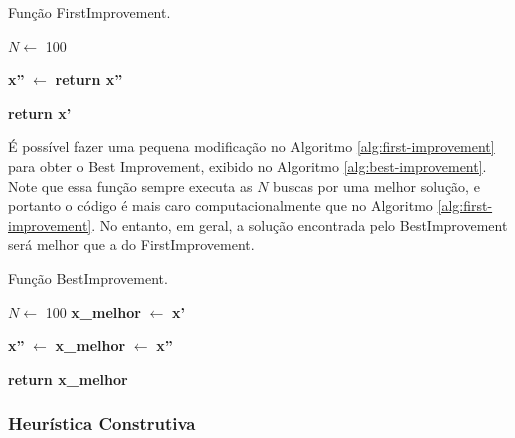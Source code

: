 \documentclass[conference]{IEEEtran}
\begin{document}
\begin{algorithm}[H]
	\caption{Função FirstImprovement.}\label{alg:first-improvement}

	\begin{algorithmic}[1]

	\State $N\gets$ 100 

		\State \textbf{x''} $\gets$  
			\State \textbf{return x''} 
		\EndIf
	\EndFor
		
	\Statex
	\State \textbf{return x'} 
	\EndProcedure 
	\end{algorithmic}
\end{algorithm}

É possível fazer uma pequena modificação no Algoritmo \ref{alg:first-improvement} 
para obter o Best Improvement, exibido no Algoritmo \ref{alg:best-improvement}. 
Note que essa função sempre executa as $N$ buscas por uma melhor solução, e 
portanto o código é mais caro computacionalmente que no Algoritmo \ref{alg:first-improvement}.
No entanto, em geral, a solução encontrada pelo BestImprovement será melhor que a 
do FirstImprovement.

\begin{algorithm}[H]
	\caption{Função BestImprovement.}\label{alg:best-improvement}

	\begin{algorithmic}[1]

	\State $N\gets$ 100 
	\State \textbf{x\_melhor} $\gets$ \textbf{x'}

		\State \textbf{x''} $\gets$  
			\State \textbf{x\_melhor} $\gets$ \textbf{x''}
		\EndIf
	\EndFor
		
	\Statex
	\State \textbf{return x\_melhor} 
	\EndProcedure 
	\end{algorithmic}
\end{algorithm}

\subsubsection{Heurística Construtiva}
\end{document}

